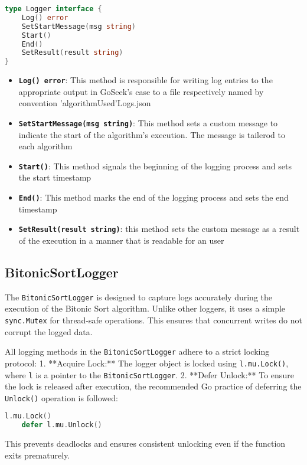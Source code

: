 \begin{lstlisting}[language=Go]
type Logger interface {
	Log() error
	SetStartMessage(msg string)
	Start()
	End()
	SetResult(result string)
}
\end{lstlisting}
\begin{itemize}
    \item \textbf{\texttt{Log() error}}: This method is responsible for writing log entries to the appropriate output in GoSeek's case to a file respectively named by convention 'algorithmUsed'Logs.json

    \item \textbf{\texttt{SetStartMessage(msg string)}}: This method sets a custom message to indicate the start of the algorithm's execution. The message is tailerod to each algorithm

    \item \textbf{\texttt{Start()}}: This method signals the beginning of the logging process and sets the start timestamp

    \item \textbf{\texttt{End()}}: This method marks the end of the logging process and sets the end timestamp

    \item \textbf{\texttt{SetResult(result string)}}: this method sets the custom message as a result of the execution in a manner that is readable for an user
\end{itemize}
\subsection{BitonicSortLogger}
The \texttt{BitonicSortLogger} is designed to capture logs accurately during the execution of the Bitonic Sort algorithm. Unlike other loggers, it uses a simple \texttt{sync.Mutex} for thread-safe operations. This ensures that concurrent writes do not corrupt the logged data. 


All logging methods in the \texttt{BitonicSortLogger} adhere to a strict locking protocol:
1. **Acquire Lock:** The logger object is locked using \texttt{l.mu.Lock()}, where \texttt{l} is a pointer to the \texttt{BitonicSortLogger}.
2. **Defer Unlock:** To ensure the lock is released after execution, the recommended Go practice of deferring the \texttt{Unlock()} operation is followed:
\begin{lstlisting}[language=Go]
	l.mu.Lock()
	defer l.mu.Unlock()
\end{lstlisting}
This prevents deadlocks and ensures consistent unlocking even if the function exits prematurely.

